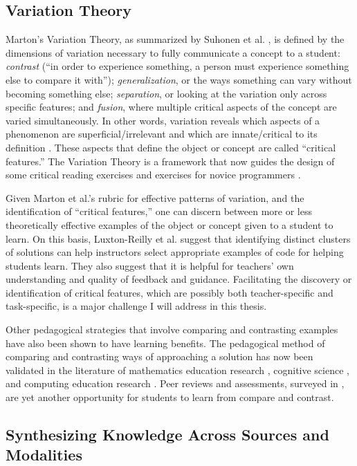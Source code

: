 \subsection{Variation Theory}
Marton's Variation Theory, as summarized by Suhonen et al. \cite{suhonen}, is defined by the dimensions of variation necessary to fully communicate a concept to a student: \emph{contrast} (``in order to experience something, a person must experience something else to compare it with''); \emph{generalization}, or the ways something can vary without becoming something else; \emph{separation}, or looking at the variation only across specific features; and \emph{fusion}, where multiple critical aspects of the concept are varied simultaneously. In other words, variation reveals which aspects of a phenomenon are superficial/irrelevant and which are innate/critical to its definition \cite{Leung}. These aspects that define the object or concept are called ``critical features.'' The Variation Theory is a framework that now guides the design of some critical reading exercises \cite{Tong} and exercises for novice programmers \cite{eckerdal}. 

Given Marton et al.'s rubric for effective patterns of variation, and the identification of ``critical features,'' one can discern between more or less theoretically effective examples of the object or concept given to a student to learn. On this basis, Luxton-Reilly et al. \cite{Luxton13} suggest that identifying distinct clusters of solutions can help instructors select appropriate examples of code for helping students learn. They also suggest that it is helpful for teachers' own understanding and quality of feedback and guidance. Facilitating the discovery or identification of critical features, which are possibly both teacher-specific and task-specific, is a major challenge I will address in this thesis. 

Other pedagogical strategies that involve comparing and contrasting examples have also been shown to have learning benefits. The pedagogical method of comparing and contrasting ways of approaching a solution has now been validated in the literature of mathematics education research \cite{Star07}, cognitive science \cite{loewenstein2003analogical,kurtz01learning,telling}, and computing education research \cite{Suhonen08, PatitsasICER13}. Peer reviews and assessments, surveyed in \cite{peerReview98}, are yet another opportunity for students to learn from compare and contrast.

\subsection{Synthesizing Knowledge Across Sources and Modalities}

